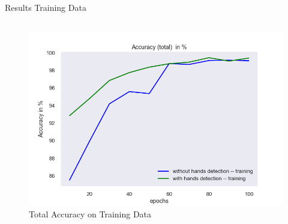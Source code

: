 \documentclass[aspectratio=169]{beamer}
\begin{document}
{\begin{frame}{Results Training Data}
\begin{columns}
    \begin{figure}
        \centering
        \includegraphics[width=1\textwidth]{img/experiment/model_comp_10steps__training_acc_total.png}
        \caption{Total Accuracy on Training Data}
    \end{figure}      


\end{columns}
\end{frame}}
\end{document}
